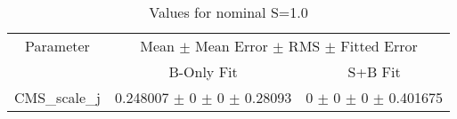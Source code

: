 \begin{table}
\centering
\caption{Values for nominal S=1.0}
\begin{tabular}{ccc}
\toprule
Parameter & \multicolumn{2}{c}{Mean $\pm$ Mean Error $\pm$ RMS $\pm$ Fitted Error}\\
 & B-Only Fit & S+B Fit\\
\midrule
CMS\_scale\_j & \num{0.248007} $\pm$ \num{0} $\pm$ \num{0} $\pm$ \num{0.28093} & \num{0} $\pm$ \num{0} $\pm$ \num{0} $\pm$ \num{0.401675}\\
\bottomrule
\end{tabular}
\end{table}